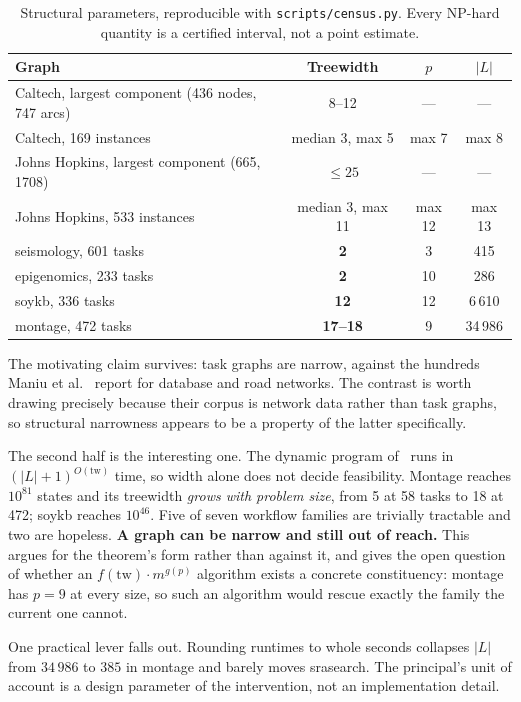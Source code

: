 \documentclass[10pt]{article}
\newcommand{\tw}{\mathrm{tw}}
\begin{document}
\begin{table}[t]
\centering
\begin{tabular}{lccc}
\toprule
Graph & Treewidth & $p$ & $|L|$ \\
\midrule
Caltech, largest component (436 nodes, 747 arcs) & 8--12 & --- & --- \\
Caltech, 169 instances            & median 3, max 5  & max 7  & max 8 \\
Johns Hopkins, largest component (665, 1708) & $\leq 25$ & --- & --- \\
Johns Hopkins, 533 instances      & median 3, max 11 & max 12 & max 13 \\
\midrule
seismology, 601 tasks             & \textbf{2}      & 3  & 415 \\
epigenomics, 233 tasks            & \textbf{2}      & 10 & 286 \\
soykb, 336 tasks                  & \textbf{12}     & 12 & 6\,610 \\
montage, 472 tasks                & \textbf{17--18} & 9  & 34\,986 \\
\bottomrule
\end{tabular}
\caption{Structural parameters, reproducible with \texttt{scripts/census.py}. Every
NP-hard quantity is a certified interval, not a point estimate.}
\label{tab:structure}
\end{table}

The motivating claim survives: task graphs are narrow, against the hundreds Maniu
et al.~\cite{maniu2019} report for database and road networks. The contrast is worth
drawing precisely because their corpus is network data rather than task graphs, so
structural narrowness appears to be a property of the latter specifically.

The second half is the interesting one. The dynamic program of~\cite{belova2026}
runs in $(|L|+1)^{O(\tw)}$ time, so width alone does not decide feasibility. Montage
reaches $10^{81}$ states and its treewidth \emph{grows with problem size}, from 5 at
58 tasks to 18 at 472; soykb reaches $10^{46}$. Five of seven workflow families are
trivially tractable and two are hopeless. \textbf{A graph can be narrow and still out
of reach.} This argues for the theorem's form rather than against it, and gives the
open question of whether an $f(\tw) \cdot m^{g(p)}$ algorithm exists a concrete
constituency: montage has $p = 9$ at every size, so such an algorithm would rescue
exactly the family the current one cannot.

One practical lever falls out. Rounding runtimes to whole seconds collapses $|L|$
from $34\,986$ to $385$ in montage and barely moves srasearch. The principal's unit
of account is a design parameter of the intervention, not an implementation detail.
\end{document}
